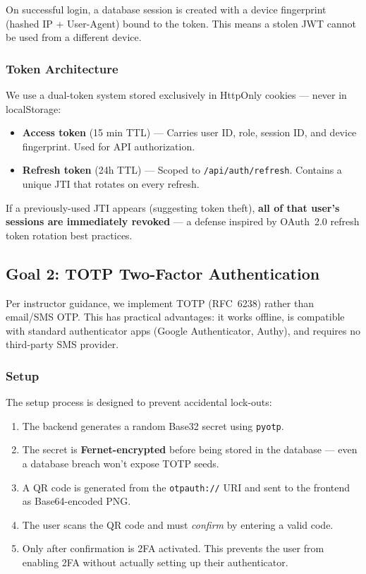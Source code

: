 On successful login, a database session is created with a device fingerprint (hashed IP + User-Agent) bound to the token. This means a stolen JWT cannot be used from a different device.

\subsubsection{Token Architecture}

We use a dual-token system stored exclusively in HttpOnly cookies — never in localStorage:

\begin{itemize}
    \item \textbf{Access token} (15 min TTL) — Carries user ID, role, session ID, and device fingerprint. Used for API authorization.
    \item \textbf{Refresh token} (24h TTL) — Scoped to \texttt{/api/auth/refresh}. Contains a unique JTI that rotates on every refresh.
\end{itemize}

If a previously-used JTI appears (suggesting token theft), \textbf{all of that user's sessions are immediately revoked} — a defense inspired by OAuth~2.0 refresh token rotation best practices.

\subsection{Goal 2: TOTP Two-Factor Authentication}

Per instructor guidance, we implement TOTP (RFC~6238) rather than email/SMS OTP. This has practical advantages: it works offline, is compatible with standard authenticator apps (Google Authenticator, Authy), and requires no third-party SMS provider.

\subsubsection{Setup}

The setup process is designed to prevent accidental lock-outs:

\begin{enumerate}
    \item The backend generates a random Base32 secret using \texttt{pyotp}.
    \item The secret is \textbf{Fernet-encrypted} before being stored in the database — even a database breach won't expose TOTP seeds.
    \item A QR code is generated from the \texttt{otpauth://} URI and sent to the frontend as Base64-encoded PNG.
    \item The user scans the QR code and must \textit{confirm} by entering a valid code.
    \item Only after confirmation is 2FA activated. This prevents the user from enabling 2FA without actually setting up their authenticator.
\end{enumerate}

